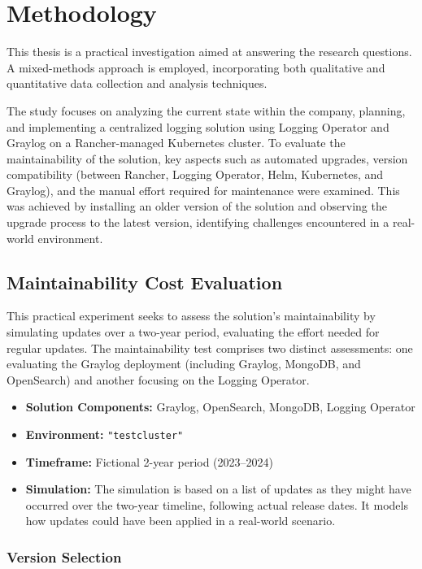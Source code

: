 \documentclass[../main.tex]{subfiles}
\begin{document}
\chapter{Methodology}

This thesis is a practical investigation aimed at answering the research questions. A mixed-methods approach is employed, incorporating both qualitative and quantitative data collection and analysis techniques.

The study focuses on analyzing the current state within the company, planning, and implementing a centralized logging solution using Logging Operator and Graylog on a Rancher-managed Kubernetes cluster. To evaluate the maintainability of the solution, key aspects such as automated upgrades, version compatibility (between Rancher, Logging Operator, Helm, Kubernetes, and Graylog), and the manual effort required for maintenance were examined. This was achieved by installing an older version of the solution and observing the upgrade process to the latest version, identifying challenges encountered in a real-world environment.



\section{Maintainability Cost Evaluation}

This practical experiment seeks to assess the solution's maintainability by simulating updates over a two-year period, evaluating the effort needed for regular updates. The maintainability test comprises two distinct assessments: one evaluating the Graylog deployment (including Graylog, MongoDB, and OpenSearch) and another focusing on the Logging Operator.

\begin{itemize}
    \item \textbf{Solution Components:} Graylog, OpenSearch, MongoDB, Logging Operator
    \item \textbf{Environment:} \texttt{"testcluster"} 
    \item \textbf{Timeframe:} Fictional 2-year period (2023–2024)
    \item \textbf{Simulation:} The simulation is based on a list of updates as they might have occurred over the two-year timeline, following actual release dates. It models how updates could have been applied in a real-world scenario.
\end{itemize}

\subsection{Version Selection}
\end{document}
